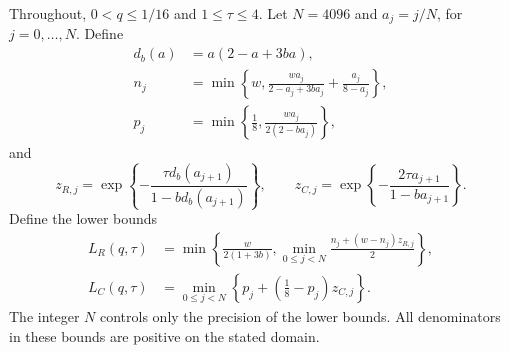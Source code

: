 \documentclass{alt2027}
\begin{document}
Throughout, $0 < q \leq 1/16$ and $1 \leq \tau \leq 4$. Let $N = 4096$ and
$a_j = j/N$, for $j = 0,\ldots,N$. Define
\[
  \begin{aligned}
    d_b(a) & = a(2 - a + 3ba),                                                            \\
    n_j    & = \min\left\{ w,\frac{wa_j}{2 - a_j + 3ba_j} + \frac{a_j}{8 - a_j} \right\}, \\
    p_j    & = \min\left\{ \frac18,\frac{wa_j}{2(2 - ba_j)} \right\},
  \end{aligned}
\]
and
\[
  z_{R,j} = \exp\left\{ -\frac{\tau d_b(a_{j+1})}
                                  {1 - bd_b(a_{j+1})} \right\},\qquad z_{C,j}
          = \exp\left\{ -\frac{2\tau a_{j+1}}{1 - ba_{j+1}} \right\}.
\]
Define the lower bounds
\begin{equation}
  \begin{aligned}
    L_R(q,\tau) & = \min\left\{ \frac{w}{2(1 + 3b)}, \min_{0 \leq j<N}\frac{n_j + (w - n_j)z_{R,j}}2 \right\}, \\
    L_C(q,\tau) & = \min_{0 \leq j<N}\left\{ p_j + \left( \frac18 - p_j \right)z_{C,j} \right\}.
  \end{aligned} \label{eq:predictive-finite-lower}
\end{equation}
The integer $N$ controls only the precision of the lower bounds. All
denominators in these bounds are positive on the stated domain.
\end{document}
